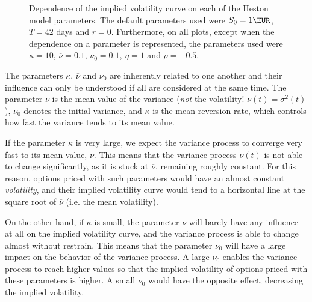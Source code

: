 \begin{figure}[H]
  \begin{subfigmatrix}{2}
  \end{subfigmatrix}
  \caption[Dependence of the implied volatility curve on each of the Heston model parameters.]{Dependence of the implied volatility curve on each of the Heston model parameters. The default parameters used were $S_0=1\EUR$, $T=42$ days and $r=0$. Furthermore, on all plots, except when the dependence on a parameter is represented, the parameters used were $\kappa=10$, $\overline{\nu}=0.1$, $\nu_0=0.1$, $\eta=1$ and $\rho=-0.5$.}
  \label{fig:Hparam}
\end{figure}

The parameters $\kappa$, $\overline{\nu}$ and $\nu_0$ are inherently related to one another and their influence can only be understood if all are considered at the same time. The parameter $\overline{\nu}$ is the mean value of the variance (\emph{not} the volatility! $\nu(t)=\sigma^2(t)$), $\nu_0$ denotes the initial variance, and $\kappa$ is the mean-reversion rate, which controls how fast the variance tends to its mean value.

If the parameter $\kappa$ is very large, we expect the variance process to converge very fast to its mean value, $\overline{\nu}$. This means that the variance process $\nu(t)$ is not able to change significantly, as it is stuck at $\overline{\nu}$, remaining roughly constant. For this reason, options priced with such parameters would have an almost constant \emph{volatility}, and their implied volatility curve would tend to a horizontal line at the square root of $\overline{\nu}$ (i.e. the mean volatility).

On the other hand, if $\kappa$ is small, the parameter $\overline{\nu}$ will barely have any influence at all on the implied volatility curve, and the variance process is able to change almost without restrain. This means that the parameter $\nu_0$ will have a large impact on the behavior of the variance process. A large $\nu_0$ enables the variance process to reach higher values so that the implied volatility of options priced with these parameters is higher. A small $\nu_0$ would have the opposite effect, decreasing the implied volatility.

